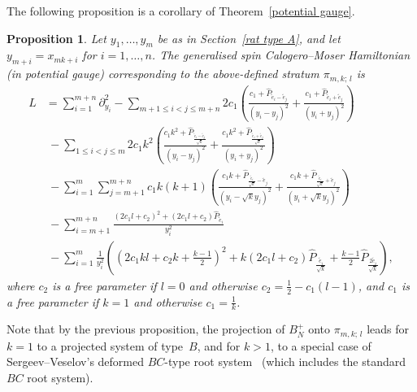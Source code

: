 \documentclass[12pt]{amsart}
\numberwithin{equation}{section}
\newtheorem{prop}[theorem]{Proposition}
\theoremstyle{definition}
\begin{document}
The following proposition is a corollary of Theorem~\ref{potential gauge}.
\begin{prop}


Let $y_1, \dots, y_m$ be as in Section~\ref{rat type A}, and let $y_{m+i} = x_{mk+i}$ for $i=1, \dots, n$.
The generalised spin Calogero--Moser Hamiltonian (in potential gauge) corresponding to the above-defined stratum  $\pi_{m,k;\, l}$ is
\begin{align}
    L &= \sum_{i=1}^{m+n} \partial_{y_i}^2 - \sum\limits_{m+1 \leq i < j \leq m+n} 2 c_1 \left(\frac{c_1 + \widehat{P}_{\widetilde{e}_i-\widetilde{e}_j}}{(y_i - y_j)^2} + \frac{c_1 + \widehat{P}_{\widetilde{e}_i+ \widetilde{e}_j}}{(y_i + y_j)^2} \right) \label{DeformedHam}
    \\
    & \ -\sum\limits_{1 \leq i < j \leq m} 2 c_1 k^2\left(\frac{c_1 k^2 + \widehat{P}_{\frac{\widetilde{e}_i - \widetilde{e}_j}{\sqrt{k}}}}{(y_i -y_j)^2} + \frac{c_1 k^2 + \widehat{P}_{\frac{\widetilde{e}_i + \widetilde{e}_j}{\sqrt{k}}}}{(y_i + y_j)^2} \right) \nonumber
    \\
    & \ - \sum\limits_{i = 1}^m \sum\limits_{j = m+1}^{m+n} c_1 k(k+1) \left(\frac{c_1 k +  \widehat{P}_{\frac{\widetilde{e}_i}{\sqrt{k}}-\widetilde{e}_j}}{(y_i - \sqrt{k} y_j)^2} + \frac{c_1 k + \widehat{P}_{\frac{\widetilde{e}_i}{\sqrt{k}} + \widetilde{e}_j}}{(y_i + \sqrt{k} y_j)^2}  \right) \nonumber
    \\ 
    & \ -\sum\limits_{ i = m+1}^{m+n} \frac{(2 c_1 l + c_2)^2 + (2 c_1 l + c_2)\widehat{P}_{\widetilde{e}_i}}{y_i^2} \nonumber
    \\
    & \ -\sum\limits_{i = 1}^m \frac{1}{y_i^2}\left(\left(2c_1kl + c_2k + \frac{k-1}{2}\right)^2 
     + 
     k \left(2c_1 l  +  c_2\right)\widehat{P}_{\frac{\widetilde{e}_i}{\sqrt{k}}}
      + \frac{k-1}{2}  \widehat{P}_{\frac{2\widetilde{e}_i}{\sqrt{k}}}\right), \nonumber
\end{align}
where $c_2$ is a free parameter if $l = 0$ and otherwise $c_2 = \frac{1}{2} - c_1(l - 1)$, and $c_1$ is a free parameter if $k=1$ and otherwise $c_1 = \frac1k$. 
\end{prop}

Note that by the previous proposition, the projection of $B_N^+$ onto $\pi_{m,k; \, l}$ leads for $k=1$ to a projected system of type~$B$, and for $k>1$, to a special case of Sergeev--Veselov's deformed $BC$-type root system~\cite{SV} (which includes the standard $BC$ root system).
\end{document}
